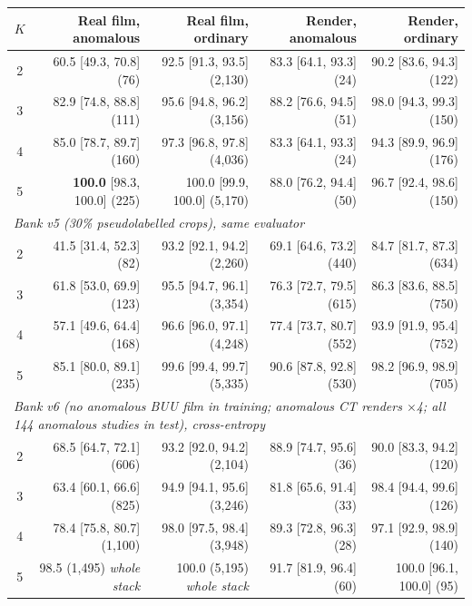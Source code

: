 \documentclass[11pt,letterpaper]{article}
\newcommand{\ci}[2]{[#1, #2]}
\begin{document}
\begin{center}\small
\begin{tabular}{crrrr}\toprule
$K$ & Real film, anomalous & Real film, ordinary & Render, anomalous & Render, ordinary \\ \midrule
2 & 60.5 \ci{49.3}{70.8} (76) & 92.5 \ci{91.3}{93.5} (2,130) & 83.3 \ci{64.1}{93.3} (24) & 90.2 \ci{83.6}{94.3} (122) \\
3 & 82.9 \ci{74.8}{88.8} (111) & 95.6 \ci{94.8}{96.2} (3,156) & 88.2 \ci{76.6}{94.5} (51) & 98.0 \ci{94.3}{99.3} (150) \\
4 & 85.0 \ci{78.7}{89.7} (160) & 97.3 \ci{96.8}{97.8} (4,036) & 83.3 \ci{64.1}{93.3} (24) & 94.3 \ci{89.9}{96.9} (176) \\
5 & \textbf{100.0} \ci{98.3}{100.0} (225) & 100.0 \ci{99.9}{100.0} (5,170) & 88.0 \ci{76.2}{94.4} (50) & 96.7 \ci{92.4}{98.6} (150) \\ \midrule
\multicolumn{5}{l}{\emph{Bank v5 (30\% pseudolabelled crops), same evaluator}} \\
2 & 41.5 \ci{31.4}{52.3} (82) & 93.2 \ci{92.1}{94.2} (2,260) & 69.1 \ci{64.6}{73.2} (440) & 84.7 \ci{81.7}{87.3} (634) \\
3 & 61.8 \ci{53.0}{69.9} (123) & 95.5 \ci{94.7}{96.1} (3,354) & 76.3 \ci{72.7}{79.5} (615) & 86.3 \ci{83.6}{88.5} (750) \\
4 & 57.1 \ci{49.6}{64.4} (168) & 96.6 \ci{96.0}{97.1} (4,248) & 77.4 \ci{73.7}{80.7} (552) & 93.9 \ci{91.9}{95.4} (752) \\
5 & 85.1 \ci{80.0}{89.1} (235) & 99.6 \ci{99.4}{99.7} (5,335) & 90.6 \ci{87.8}{92.8} (530) & 98.2 \ci{96.9}{98.9} (705) \\ \midrule
\multicolumn{5}{l}{\emph{Bank v6 (no anomalous BUU film in training; anomalous CT renders $\times$4; all 144 anomalous studies in test), cross-entropy}} \\
2 & 68.5 \ci{64.7}{72.1} (606) & 93.2 \ci{92.0}{94.2} (2,104) & 88.9 \ci{74.7}{95.6} (36) & 90.0 \ci{83.3}{94.2} (120) \\
3 & 63.4 \ci{60.1}{66.6} (825) & 94.9 \ci{94.1}{95.6} (3,246) & 81.8 \ci{65.6}{91.4} (33) & 98.4 \ci{94.4}{99.6} (126) \\
4 & 78.4 \ci{75.8}{80.7} (1,100) & 98.0 \ci{97.5}{98.4} (3,948) & 89.3 \ci{72.8}{96.3} (28) & 97.1 \ci{92.9}{98.9} (140) \\
5 & 98.5 (1,495) \emph{whole stack} & 100.0 (5,195) \emph{whole stack} & 91.7 \ci{81.9}{96.4} (60) & 100.0 \ci{96.1}{100.0} (95) \\ \bottomrule
\end{tabular}
\end{center}
\end{document}
